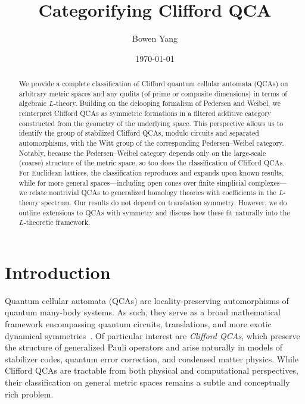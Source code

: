 \documentclass{article}
\title{Categorifying Clifford QCA}
\author{Bowen Yang}
\affil{Center of Mathematical Sciences and Applications, Harvard University, Cambridge, Massachusetts 02138, USA}
\date{\today}
\theoremstyle{definition}
\begin{document}
\maketitle
\begin{abstract}
We provide a complete classification of Clifford quantum cellular automata (QCAs) on arbitrary metric spaces and any qudits (of prime or composite dimensions) in terms of algebraic \( L \)-theory. Building on the delooping formalism of Pedersen and Weibel, we reinterpret Clifford QCAs as symmetric formations in a filtered additive category constructed from the geometry of the underlying space. This perspective allows us to identify the group of stabilized Clifford QCAs, modulo circuits and separated automorphisms, with the Witt group of the corresponding Pedersen--Weibel category. Notably, because the Pedersen–Weibel category depends only on the large-scale (coarse) structure of the metric space, so too does the classification of Clifford QCAs. For Euclidean lattices, the classification reproduces and expands upon known results, while for more general spaces---including open cones over finite simplicial complexes---we relate nontrivial QCAs to generalized homology theories with coefficients in the \( L \)-theory spectrum. Our results do not depend on translation symmetry. However, we do outline extensions to QCAs with symmetry and discuss how these fit naturally into the \( L \)-theoretic framework.
\end{abstract}

\section{Introduction}

Quantum cellular automata (QCAs) are locality-preserving automorphisms of quantum many-body systems. As such, they serve as a broad mathematical framework encompassing quantum circuits, translations, and more exotic dynamical symmetries~\cite{freedman2020classification,gross2012index, haah2021clifford, haah2023nontrivial, haah2025topological, shirley2022three, chen2023exactly, fidkowski2024pumping, fidkowski2024qca}. Of particular interest are \emph{Clifford QCAs}, which preserve the structure of generalized Pauli operators and arise naturally in models of stabilizer codes, quantum error correction, and condensed matter physics. While Clifford QCAs are tractable from both physical and computational perspectives, their classification on general metric spaces remains a subtle and conceptually rich problem.
\end{document}
